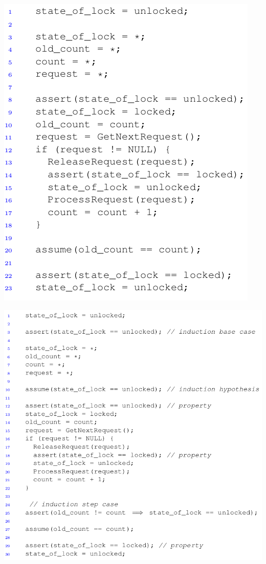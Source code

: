 \documentclass{beamer}
\begin{document}
\begin{frame}
\includegraphics[scale=0.45]{new_code1.png}
\end{frame}

\begin{frame}
\includegraphics[scale=0.35]{new_code2.png}
\end{frame}
\end{document}
